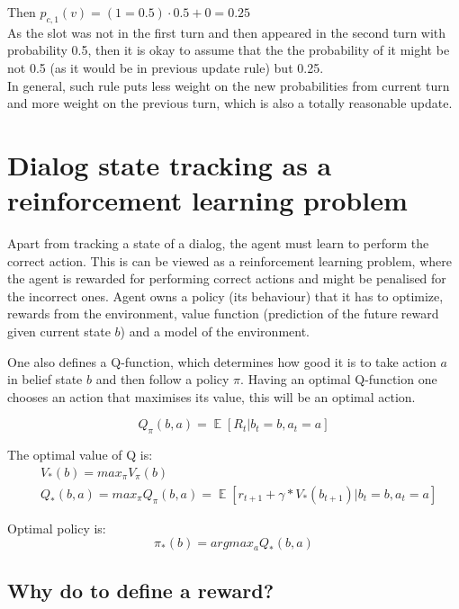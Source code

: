 \documentclass[12pt,titlepage,a4paper]{article}
\DeclareMathOperator*{\E}{\mathbb{E}}
\begin{document}
\noindent Then $p_{c,1}(v) = (1 = 0.5) \cdot 0.5 + 0 = 0.25$ \\

\noindent As the slot was not in the first turn and then appeared in the second turn with probability 0.5, then it is okay to assume that the the probability of it might be not 0.5 (as it would be in previous update rule) but 0.25. \\

\noindent In general, such rule puts less weight on the new probabilities from current turn and more weight on the previous turn, which is also a totally reasonable update. 


\section{Dialog state tracking as a reinforcement learning problem}
Apart from tracking a state of a dialog, the agent must learn to perform the correct action. This is can be viewed as a reinforcement learning problem, where the agent is rewarded for performing correct actions and might be penalised for the incorrect ones. Agent owns a policy (its behaviour) that it has to optimize, rewards from the environment, value function (prediction of the future reward given current state $b$) and a model of the environment.

One also defines a Q-function, which determines how good it is to take action $a$ in belief state $b$ and then follow a policy $\pi$. Having an optimal Q-function one chooses an action that maximises its value, this will be an optimal action.


\begin{equation}
    Q_{\pi}(b, a) = \E[R_t| b_t = b, a_t = a]
\end{equation}

The optimal value of Q is:
\begin{align}
    &V_{*}(b) = max_{\pi}V_{\pi}(b) \\
    &Q_{*}(b, a) = max_{\pi}Q_{\pi}(b, a) = \E[r_{t+1} + \gamma * V_{*}(b_{t+1})| b_t = b, a_t = a]
\end{align}

Optimal policy is: 
\begin{equation}
    \pi_{*}(b) = argmax_{a} Q_{*}(b, a)
\end{equation}


\subsection{Why do to define a reward?}
\end{document}
